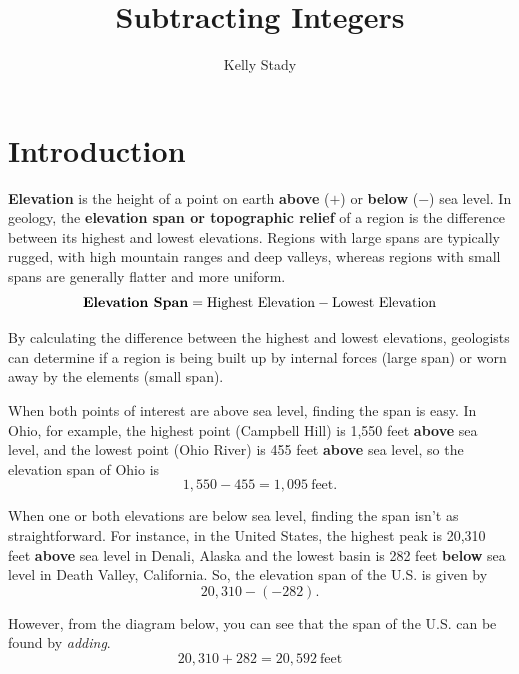\documentclass{ximera}[font=12pt]
\title{Subtracting Integers}   %
\author{Kelly Stady}
\begin{document}
\begin{abstract}

\end{abstract}

\maketitle
\label{xim:SubtractIntActivity}


\section*{Introduction}

\textbf{Elevation} is the height of a point on earth \textbf{above} ($+$) or \textbf{below} ($-$) sea level.  In geology, the \textbf{elevation span or topographic relief} of a region is the difference between its highest and lowest elevations. Regions with large spans are typically rugged, with high mountain ranges and deep valleys, whereas regions with small spans are generally flatter and more uniform.
\[ \textrm{\textbf{Elevation Span}} = \textrm{Highest Elevation} - \textrm{Lowest Elevation} \]

By calculating the difference between the highest and lowest elevations, geologists can determine if a region is being built up by internal forces (large span) or worn away by the elements (small span).

When both points of interest are above sea level, finding the span is easy.  In Ohio, for example, the highest point (Campbell Hill) is 1,550 feet \textbf{above} sea level, and the lowest point (Ohio River) is 455 feet \textbf{above} sea level, so the elevation span of Ohio is
\[ 1,550 - 455 = 1,095 \ \textrm{feet}. \]

When one or both elevations are below sea level, finding the span isn't as straightforward.  For instance, in the United States, the highest peak is 20,310 feet \textbf{above} sea level in Denali, Alaska and the lowest basin is 282 feet \textbf{below} sea level in Death Valley, California.  So, the elevation span of the U.S. is given by
\[ 20,310 - (-282). \]

However, from the diagram below, you can see that the span of the U.S. can be found by \emph{adding}.
\[ 20,310 + 282 = 20,592 \ \textrm{feet} \]
\end{document}
